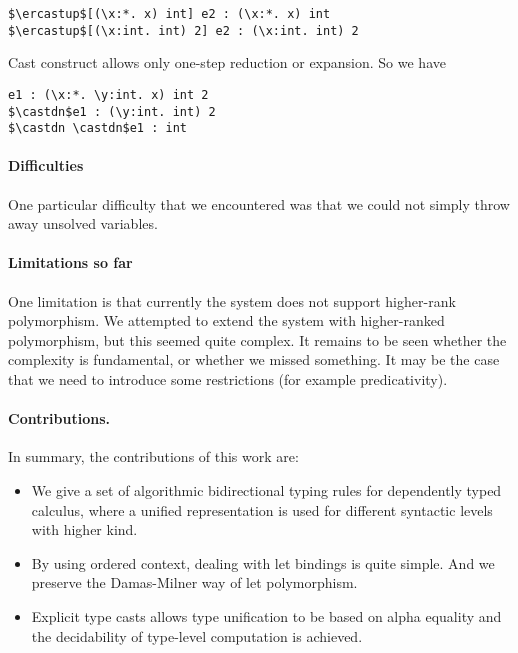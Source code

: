 \begin{lstlisting}
$\ercastup$[(\x:*. x) int] e2 : (\x:*. x) int
$\ercastup$[(\x:int. int) 2] e2 : (\x:int. int) 2
\end{lstlisting}

Cast construct allows only one-step reduction or expansion. So we have

\begin{lstlisting}
e1 : (\x:*. \y:int. x) int 2
$\castdn$e1 : (\y:int. int) 2
$\castdn \castdn$e1 : int
\end{lstlisting}

\paragraph{Difficulties}
One particular difficulty that we encountered was that we could 
not simply throw away unsolved variables. 

\paragraph{Limitations so far}
One limitation is that currently the system does not support
higher-rank polymorphism. We attempted to extend the system 
with higher-ranked polymorphism, but this seemed quite complex.
It remains to be seen whether the complexity is fundamental, or 
whether we missed something. It may be the case that we need to 
introduce some restrictions (for example predicativity).


\paragraph{Contributions.} In summary, the contributions of this work are:
\begin{itemize}
\item We give a set of algorithmic bidirectional typing rules for dependently typed calculus, where a unified representation is used for different syntactic levels with higher kind.
\item By using ordered context, dealing with let bindings is quite simple. And we preserve the Damas-Milner way of let polymorphism.
\item Explicit type casts allows type unification to be based on alpha equality and the decidability of type-level computation is achieved.
\end{itemize}
